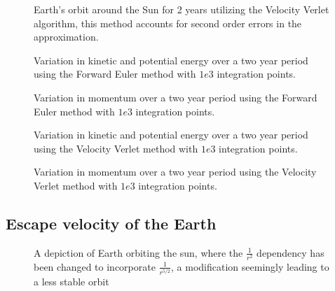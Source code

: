 \documentclass{emulateapj}
\begin{document}
\begin{figure}[t]

\mbox{}

\caption{Earth's orbit around the Sun for 2 years utilizing the Velocity Verlet algorithm, this method accounts for second order errors in the approximation.}
\label{fig:3c_verlet}
\end{figure}

\begin{figure}[t]
\mbox{}

\caption{Variation in kinetic and potential energy over a two year period using the Forward Euler method with $1e3$ integration points.}
\label{fig:energy_euler}
\end{figure}

\begin{figure}[t]
\mbox{}
\caption{Variation in momentum over a two year period using the Forward Euler method with $1e3$ integration points.}
\label{fig:mom_euler}
\end{figure}

\begin{figure}[t]

\mbox{}

\caption{Variation in kinetic and potential energy over a two year period using the Velocity Verlet method with $1e3$ integration points.}
\label{fig:energy_verlet}
\end{figure}

\begin{figure}[t]

\mbox{}

\caption{Variation in momentum over a two year period using the Velocity Verlet method with $1e3$ integration points.}
\label{fig:mom_verlet}
\end{figure}

\subsection{Escape velocity of the Earth}

\begin{figure}[t]

\mbox{}

\caption{A depiction of Earth orbiting the sun, where the $\frac{1}{r^{2}}$ dependency has been changed to incorporate $\frac{1}{r^{5/2}}$, a modification seemingly leading to a less stable orbit}
\label{fig:beta2'5}
\end{figure}
\end{document}
